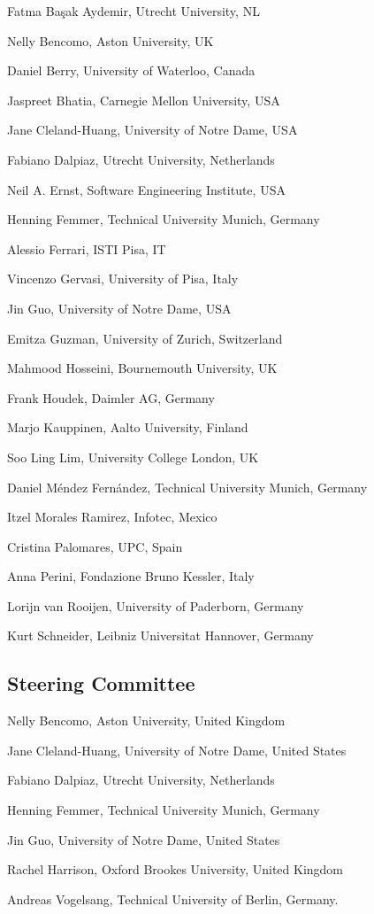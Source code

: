 \documentclass[conference,9pt]{IEEEtran}
\begin{document}
Fatma Ba\c{s}ak Aydemir, Utrecht University, NL

Nelly Bencomo, Aston University, UK

Daniel Berry, University of Waterloo, Canada

Jaspreet Bhatia, Carnegie Mellon University, USA

Jane Cleland-Huang, University of Notre Dame, USA

Fabiano Dalpiaz, Utrecht University, Netherlands

Neil A. Ernst, Software Engineering Institute, USA

Henning Femmer, Technical University Munich, Germany

Alessio Ferrari, ISTI Pisa, IT

Vincenzo Gervasi, University of Pisa, Italy

Jin Guo, University of Notre Dame, USA

Emitza Guzman, University of Zurich, Switzerland

Mahmood Hosseini, Bournemouth University, UK

Frank Houdek, Daimler AG, Germany

Marjo Kauppinen, Aalto University, Finland

Soo Ling Lim, University College London, UK

Daniel M{\'e}ndez Fern{\'a}ndez, Technical University Munich, Germany

Itzel Morales Ramirez, Infotec, Mexico

Cristina Palomares, UPC, Spain

Anna Perini, Fondazione Bruno Kessler, Italy

Lorijn van Rooijen, University of Paderborn, Germany

Kurt Schneider, Leibniz Universitat Hannover, Germany

\subsection{Steering Committee}
Nelly Bencomo, Aston University, United Kingdom

Jane Cleland-Huang, University of Notre Dame, United States

Fabiano Dalpiaz, Utrecht University, Netherlands

Henning Femmer, Technical University Munich, Germany

Jin Guo, University of Notre Dame, United States

Rachel Harrison, Oxford Brookes University, United Kingdom

Andreas Vogelsang, Technical University of Berlin, Germany.
\end{document}
